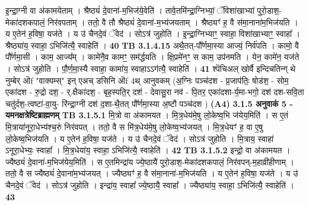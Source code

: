 \documentclass[17pt]{extarticle}
\begin{document}
{{                  इ॒न्द्रा॒ग्नी वा अ॑कामयेताम् । श्रैष्ठ्यं॑ दे॒वाना॑-म॒भिज॑ये॒वेति॑ । तावे॒तमि॑न्द्रा॒ग्निभ्यां॒ ॅविशा॑खाभ्यां पुरो॒डाश॒-मेका॑दशकपालं॒ निर॑वपताम् । ततो॒ वै तौ श्रैष्ठ्यं॑ दे॒वाना॑-म॒भ्य॑जयताम् । श्रैष्ठ्यꣳ॑ ह॒ वै स॑मा॒नाना॑म॒भिज॑यति । य ए॒तेन॑ ह॒विषा॒ यज॑ते । य उ॑ चैनदे॒वं ॅवेद॑ । सोऽत्र॑ जुहोति । इ॒न्द्रा॒ग्निभ्याꣳ॒॒ स्वाहा॒ विशा॑खाभ्याꣳ॒॒ स्वाहा᳚ । श्रैष्ठ्या॑य॒ स्वाहा॒ ऽभिजि॑त्यै॒ स्वाहेति॑ । \textbf{ 40} \newline
                  \newline
                                \textbf{ TB 3.1.4.15} \newline
                  अथै॒तत्-पौ᳚र्णमा॒स्या आज्यं॒ निर्व॑पति । कामो॒ वै पौ᳚र्णमा॒सी । काम॒ आज्य᳚म् । कामे॑नै॒व कामꣳ॒॒ सम॑र्द्धयति । क्षि॒प्रमे॑नꣳ॒॒ स काम॒ उप॑नमति । येन॒ कामे॑न॒ यज॑ते । सोऽत्र॑ जुहोति । पौ॒र्ण॒मा॒स्यै स्वाहा॒ कामा॑य॒ स्वाहाऽऽग॑त्यै॒ स्वाहेति॑ । \textbf{ 41} \newline
                  \newline
                                    श्पॆचिअल् खोर्वै इन्दिचतिन्ग् थे नुम्बेर् ऒf "वाक्यम्स्" इन् एअच् डसिनि ऒf 4थ् आनुवकम्  (अ॒ग्निः पञ्च॑दश - प्र॒जाप॑तिः॒ षोड॑श॒ - सोम॒ एका॑दश - रु॒द्रो दश॒ - र्.क्षैका॑दश॒ - बृह॒स्पति॒र् दश॑ - देवासु॒रा नव॑ - पि॒तर॒ एका॑दशा-र्य॒मा-भगो॒ दश॑ दश-सवि॒ता चतु॑र्दश॒-त्वष्टा॑-वा॒यु- रि॑न्द्रा॒ग्नी दश॑ द॒शा-थै॒तत् पौ᳚र्णमा॒स्या अ॒ष्टौ पञ्च॑दश ) \textbf{(A4)} \newline \newline
                \textbf{ 3.1.5     अनुवाकं   5 - यमनक्षत्रेष्टिब्राह्मणम्} \newline
                                \textbf{ TB 3.1.5.1} \newline
                  मि॒त्रो वा अ॑कामयत । मि॒त्र॒धेय॑मे॒षु लो॒केष्व॒भि ज॑येय॒मिति॑ । स ए॒तं मि॒त्राया॑नूरा॒धेभ्य॑श्च॒रुं निर॑वपत् । ततो॒ वै स मि॑त्र॒धेय॑मे॒षु लो॒केष्व॒भ्य॑जयत् । मि॒त्र॒धेयꣳ॑ ह॒ वा ए॒षु लो॒केष्व॒भिज॑यति । य ए॒तेन॑ ह॒विषा॒ यज॑ते । य उ॑ चैनदे॒वं ॅवेद॑ । सोऽत्र॑ जुहोति । मि॒त्राय॒ स्वाहा॑ ऽनूरा॒धेभ्यः॒ स्वाहा᳚ । मि॒त्र॒धेया॑य॒ स्वाहा॒ ऽभिजि॑त्यै॒ स्वाहेति॑ । \textbf{ 42} \newline
                  \newline
                                \textbf{ TB 3.1.5.2} \newline
                  इन्द्रो॒ वा अ॑कामयत । ज्यैष्ठ्यं॑ दे॒वाना॑-म॒भिज॑येय॒मिति॑ । स ए॒तमिन्द्रा॑य ज्ये॒ष्ठायै॑ पुरो॒डाश॒-मेका॑दशकपालं॒ निर॑वपन्-म॒हाव्री॑हीणाम् । ततो॒ वै स ज्यैष्ठ्यं॑ दे॒वाना॑म॒भ्य॑जयत् । ज्यैष्ठ्यꣳ॑ ह॒ वै स॑मा॒नाना॑-म॒भिज॑यति । य ए॒तेन॑ ह॒विषा॒ यज॑ते । य उ॑ चैनदे॒वं ॅवेद॑ । सोऽत्र॑ जुहोति । इन्द्रा॑य॒ स्वाहा᳚ ज्ये॒ष्ठायै॒ स्वाहा᳚ । ज्यैष्ठ्या॑य॒ स्वाहा॒ ऽभिजि॑त्यै॒ स्वाहेति॑ । \textbf{ 43} \newline
}}
\end{document}
